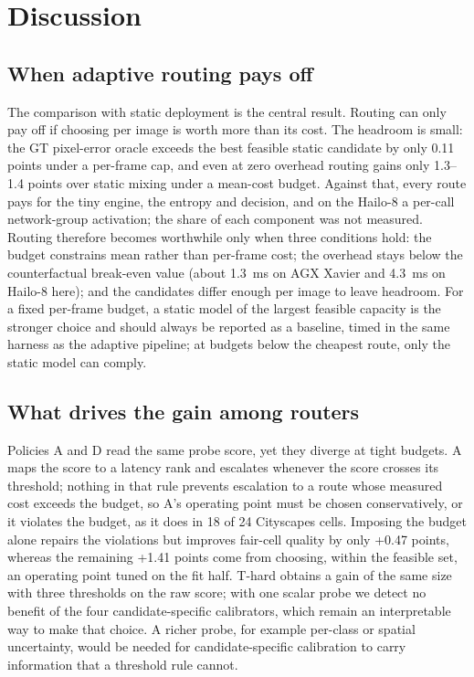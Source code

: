 \documentclass[a4paper,5p]{elsarticle}
\begin{document}
\section{Discussion}
\label{sec:discussion}

\subsection{When adaptive routing pays off}

The comparison with static deployment is the central result. Routing can only pay off if choosing per image is worth more than its cost. The headroom is small: the GT pixel-error oracle exceeds the best feasible static candidate by only 0.11 points under a per-frame cap, and even at zero overhead routing gains only 1.3--1.4 points over static mixing under a mean-cost budget. Against that, every route pays for the tiny engine, the entropy and decision, and on the Hailo-8 a per-call network-group activation; the share of each component was not measured. Routing therefore becomes worthwhile only when three conditions hold: the budget constrains mean rather than per-frame cost; the overhead stays below the counterfactual break-even value (about 1.3~ms on AGX Xavier and 4.3~ms on Hailo-8 here); and the candidates differ enough per image to leave headroom. For a fixed per-frame budget, a static model of the largest feasible capacity is the stronger choice and should always be reported as a baseline, timed in the same harness as the adaptive pipeline; at budgets below the cheapest route, only the static model can comply.

\subsection{What drives the gain among routers}

Policies A and D read the same probe score, yet they diverge at tight budgets. A maps the score to a latency rank and escalates whenever the score crosses its threshold; nothing in that rule prevents escalation to a route whose measured cost exceeds the budget, so A's operating point must be chosen conservatively, or it violates the budget, as it does in 18 of 24 Cityscapes cells. Imposing the budget alone repairs the violations but improves fair-cell quality by only +0.47 points, whereas the remaining +1.41 points come from choosing, within the feasible set, an operating point tuned on the fit half. T-hard obtains a gain of the same size with three thresholds on the raw score; with one scalar probe we detect no benefit of the four candidate-specific calibrators, which remain an interpretable way to make that choice. A richer probe, for example per-class or spatial uncertainty, would be needed for candidate-specific calibration to carry information that a threshold rule cannot.
\end{document}
